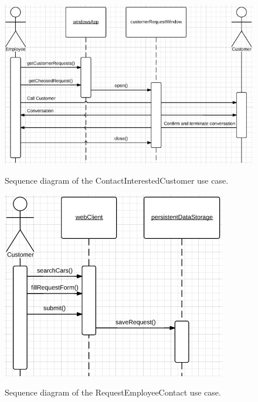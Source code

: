 \begin{figure}[H]
	\centering
		\includegraphics[width=\textwidth]{Figures/SequenceDiagram-ContactInterestedCustomer}\\
	\caption{Sequence diagram of the ContactInterestedCustomer use case.}
  \label{fig:SequenceDiagram-ContactInterestedCustomer}
\end{figure}
\begin{figure}[H]
	\centering
		\includegraphics[width=\textwidth]{Figures/SequenceDiagram-RequestEmployeeContact}\\
	\caption{Sequence diagram of the RequestEmployeeContact use case.}
  \label{fig:SequenceDiagram-RequestEmployeeContact}
\end{figure}


